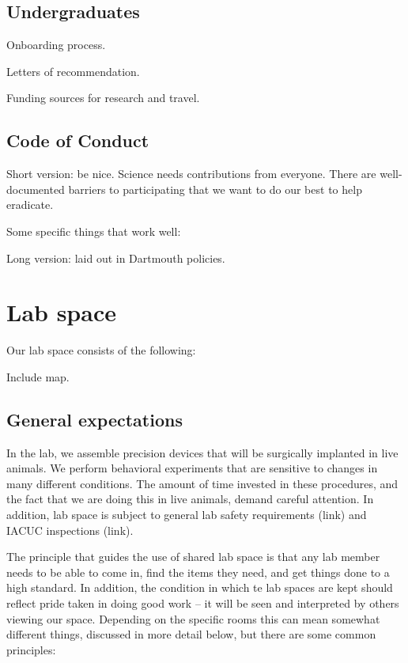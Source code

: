 \documentclass{tufte-book}
\begin{document}
\section{Undergraduates}

Onboarding process.

Letters of recommendation.

Funding sources for research and travel.


\section{Code of Conduct}

Short version: be nice. Science needs contributions from
everyone. There are well-documented barriers to participating that we
want to do our best to help eradicate.

Some specific things that work well:

Long version: laid out in Dartmouth policies.


\chapter{Lab space}

Our lab space consists of the following:

Include map.

\section{General expectations}

In the lab, we assemble precision devices that will be surgically
implanted in live animals. We perform behavioral experiments that are
sensitive to changes in many different conditions. The amount of time
invested in these procedures, and the fact that we are doing this in
live animals, demand careful attention. In addition, lab space is
subject to general lab safety requirements (link) and IACUC
inspections (link).

The principle that guides the use of shared lab space is that any lab
member needs to be able to come in, find the items they need, and get
things done to a high standard. In addition, the condition in which te
lab spaces are kept should reflect pride taken in doing good work --
it will be seen and interpreted by others viewing our space.
Depending on the specific rooms this can mean somewhat different
things, discussed in more detail below, but there are some common
principles:
\end{document}
